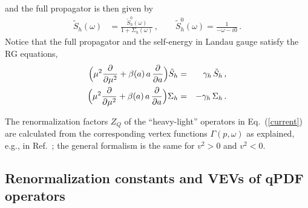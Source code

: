 \documentclass[12pt]{article}
\numberwithin{equation}{section}
\newcommand{\1}[1]{\mathbf{1}^{#1}}
\newcommand{\2}[1]{\mathbf{2}^{#1}}
\newcommand{\3}[1]{\mathbf{3}^{#1}}
\newcommand{\4}[1]{\mathbf{4}^{#1}}
\newcommand{\5}[1]{\mathbf{5}^{#1}}
\newcommand{\EQN}[1]{\hspace{3mm}\fbox{\fbox{$#1$}} \label{#1}}
\newcommand{\mlabel}[1]{ \text{\footnotesize \hspace{3mm}\fbox{\fbox{$#1$}} \label{#1}}}
\renewcommand{\EQN}[1]{\mlabel{#1}}
\renewcommand{\mlabel}[1]{\label{#1}}
\renewcommand{\EQN}[1]{\label{#1}}
\newcommand{\prd}{\partial}
\newcommand{\re}[1]{(\ref{#1})}
\newcommand{\ga}{\gamma}
\newcommand{\Si}{\Sigma}
\newcommand{\vv}{v^2}
\begin{document}
and the full propagator is then given by
\begin{align}
  \tilde{S}_h(\omega) &= \frac{\tilde{S}^0_h(\omega)}{1+\Si_h(\omega)}\,, \qquad \tilde{S}^0_h(\omega) = \frac{1}{-\omega -i0}\,.
\mlabel{S(omega)}
\end{align}
Notice that the full propagator and the 
self-energy in Landau gauge satisfy the RG equations,
%
%
\begin{eqnarray}
\Bigl(\mu^2\frac{\prd }{\prd \mu^2} + \beta(a)\, a\, \frac{\prd }{\prd a}\Bigr) \tilde{S}_h &=& \ga_h \,  \tilde{S}_h\,,\\
\Bigl(\mu^2\frac{\prd }{\prd \mu^2} + \beta(a)\, a\, \frac{\prd }{\prd a}\Bigr) {\Sigma}_h &=& -\ga_h \, {\Sigma}_h\,.
\EQN{RG:hself}
\end{eqnarray}
 
The renormalization factors $Z_Q$ of the ``heavy-light'' operators in
Eq.~\re{current} 
are calculated from the 
corresponding vertex functions $\Gamma(p,\omega)$ as explained, e.g., in
Ref.~\cite{Grozin:2004yc};
the general formalism is the same for $\vv>0$ and $\vv<0$.

\subsection{Renormalization constants and VEVs of qPDF operators} 
\end{document}
